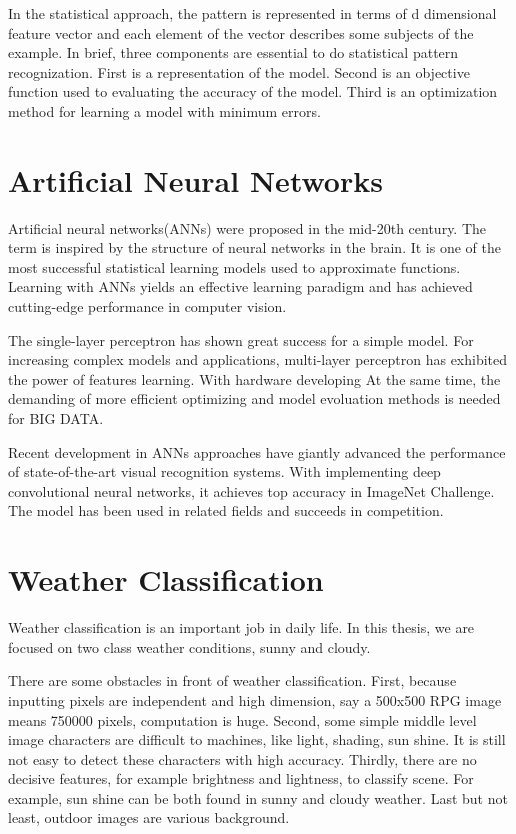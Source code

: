 In the statistical approach, the pattern is represented in terms of d dimensional feature vector and each element of the vector describes some subjects of the example. In brief, three components are essential to do statistical pattern recognization. First is a representation of the model. Second is an objective function used to evaluating the accuracy of the model. Third is an optimization method for learning a model with minimum errors.

\section{Artificial Neural Networks}

Artificial neural networks(ANNs) were proposed in the mid-20th century. The term is inspired by the structure of neural networks in the brain. It is one of the most successful statistical learning models used to approximate functions. Learning with ANNs yields an effective learning paradigm and has achieved cutting-edge performance in computer vision. 

The single-layer perceptron  has shown great success for a simple model. For increasing complex models and applications, multi-layer perceptron has exhibited the power of features learning. With hardware developing At the same time, the demanding of more efficient optimizing and model evoluation methods is needed for BIG DATA. 

Recent development in ANNs approaches have giantly advanced the performance of state-of-the-art visual recognition systems. With implementing deep convolutional neural networks, it achieves top accuracy in ImageNet Challenge. The model has been used in related fields and succeeds in competition.

\section{Weather Classification}

Weather classification is an important job in daily life. In this thesis, we are focused on two class weather conditions, sunny and cloudy. 

There are some obstacles in front of weather classification. First, because inputting pixels are independent and high dimension, say a 500x500 RPG image means 750000 pixels, computation is huge. Second, some simple middle level image characters are difficult to machines, like light, shading, sun shine. It is still not easy to detect these characters with high accuracy.  Thirdly, there are no decisive features, for example brightness and lightness, to classify scene. For example, sun shine can be both found in sunny and cloudy weather. Last but not least, outdoor images are various background.


